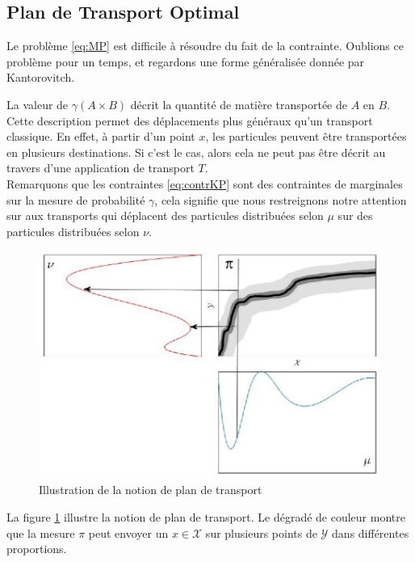 \documentclass[a4paper,12pt]{article}
\begin{document}
\subsection{Plan de Transport Optimal}
Le problème \eqref{eq:MP} est difficile à résoudre du fait de la contrainte. Oublions ce problème pour un temps, et regardons une forme généralisée donnée par Kantorovitch. \\

\vspace{0.3cm}

La valeur de $\gamma (A\times B)$ décrit la quantité de matière transportée de $A$ en $B$. Cette description permet des déplacements plus généraux qu'un transport classique. En effet, à partir d'un point $x$, les particules peuvent être transportées en plusieurs destinations. Si c'est le cas, alors cela ne peut pas être décrit au travers d'une application de transport $T$.\\
Remarquons que les contraintes \eqref{eq:contrKP} sont des contraintes de marginales sur la mesure de probabilité $\gamma$, cela signifie que nous restreignons notre attention sur aux transports qui déplacent des particules distribuées selon $\mu$ sur des particules distribuées selon $\nu$.

\begin{figure}[!h]
\centering
\includegraphics[width=0.5\linewidth]{img/transport_plan2.jpg}
\caption{Illustration de la notion de plan de transport\label{fig:plantransp}}
\end{figure}
La figure \ref{fig:plantransp} illustre la notion de plan de transport. Le dégradé de couleur montre que la mesure $\pi$ peut envoyer un $x\in\mathcal{X}$ sur plusieurs points de $\mathcal{Y}$ dans différentes proportions. \\
\end{document}
